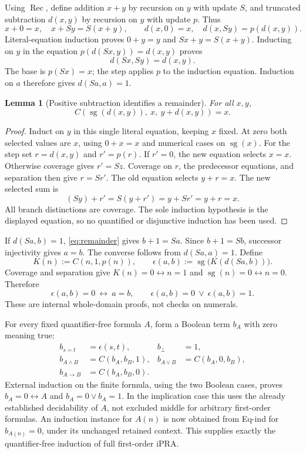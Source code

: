\documentclass[11pt,letterpaper]{article}
\newtheorem{lemma}[theorem]{Lemma}
\theoremstyle{definition}
\newcommand{\Rec}{\mathop{\mathrm{Rec}}}
\newcommand{\sg}{\mathop{\mathrm{sg}}}
\begin{document}
Using $\Rec$, define addition $x+y$ by recursion on $y$ with update
$S$, and truncated subtraction $d(x,y)$ by recursion on $y$ with
update $p$. Thus
\[
 x+0=x,\quad x+Sy=S(x+y),\qquad
 d(x,0)=x,\quad d(x,Sy)=p(d(x,y)).
\]
Literal-equation induction proves $0+y=y$ and
$Sx+y=S(x+y)$. Inducting on $y$ in the equation
$p(d(Sx,y))=d(x,y)$ proves
\[
                         d(Sx,Sy)=d(x,y).
\]
The base is $p(Sx)=x$; the step applies $p$ to the induction equation.
Induction on $a$ therefore gives $d(Sa,a)=1$.

\begin{lemma}[Positive subtraction identifies a remainder]
For all $x,y$,
\[
             C(\sg(d(x,y)),\ x,\ y+d(x,y))=x.
 \tag{Remainder}\label{eq:remainder}
\]
\end{lemma}
\begin{proof}
Induct on $y$ in this single literal equation, keeping $x$ fixed.
At zero both selected values are $x$, using $0+x=x$ and numerical
cases on $\sg(x)$. For the step set $r=d(x,y)$ and $r'=p(r)$.
If $r'=0$, the new equation selects $x=x$. Otherwise coverage gives
$r'=Sz$. Coverage on $r$, the predecessor equations, and separation
then give $r=Sr'$. The old equation selects $y+r=x$. The new selected
sum is
\[
                  (Sy)+r'=S(y+r')=y+Sr'=y+r=x.
\]
All branch distinctions are coverage. The sole induction hypothesis
is the displayed equation, so no quantified or disjunctive induction
has been used.
\end{proof}

If $d(Sa,b)=1$, \eqref{eq:remainder} gives $b+1=Sa$. Since
$b+1=Sb$, successor injectivity gives $a=b$. The converse follows
from $d(Sa,a)=1$. Define
\[
 K(n):=C(n,1,p(n)),\qquad
 \epsilon(a,b):=\sg\bigl(K(d(Sa,b))\bigr).
\]
Coverage and separation give $K(n)=0\leftrightarrow n=1$ and
$\sg(n)=0\leftrightarrow n=0$. Therefore
\[
 \epsilon(a,b)=0\ \leftrightarrow\ a=b,
 \qquad \epsilon(a,b)=0\ \vee\ \epsilon(a,b)=1.
\]
These are internal whole-domain proofs, not checks on numerals.

For every fixed quantifier-free formula $A$, form a Boolean term $b_A$
with zero meaning true:
\begin{align*}
 b_{s=t}&=\epsilon(s,t),&b_\bot&=1,\\
 b_{A\wedge B}&=C(b_A,b_B,1),&
 b_{A\vee B}&=C(b_A,0,b_B),\\
 b_{A\to B}&=C(b_A,b_B,0).
\end{align*}
External induction on the finite formula, using the two Boolean cases,
proves $b_A=0\leftrightarrow A$ and $b_A=0\vee b_A=1$.
In the implication case this uses the already established decidability
of $A$, not excluded middle for arbitrary first-order formulas.
An induction instance for $A(n)$ is now obtained from Eq-ind for
$b_{A(n)}=0$, under its unchanged retained context. This supplies
exactly the quantifier-free induction of full first-order iPRA.
\end{document}
